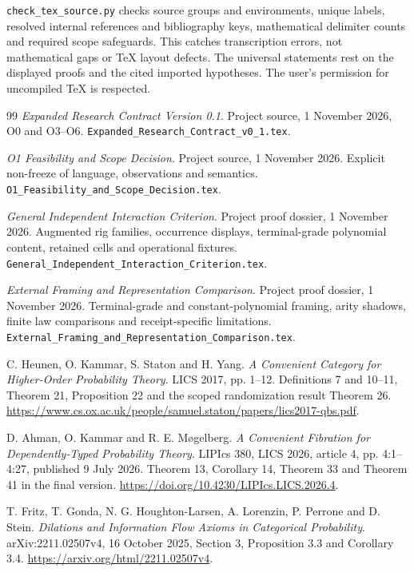 \documentclass[11pt,a4paper]{article}
\theoremstyle{definition}
\begin{document}
\texttt{check\_tex\_source.py} checks source groups and environments,
unique labels, resolved internal references and bibliography keys,
mathematical delimiter counts and required scope safeguards. This catches
transcription errors, not mathematical gaps or TeX layout defects.
The universal statements rest on the displayed proofs and the cited
imported hypotheses. The user's permission for uncompiled TeX is respected.

\begin{thebibliography}{99}
\emph{Expanded Research Contract Version 0.1}. Project source,
1 November 2026, O0 and O3--O6.
\texttt{Expanded\_Research\_Contract\_v0\_1.tex}.

\emph{O1 Feasibility and Scope Decision}. Project source,
1 November 2026. Explicit non-freeze of language, observations and semantics.
\texttt{O1\_Feasibility\_and\_Scope\_Decision.tex}.

\emph{General Independent Interaction Criterion}. Project proof dossier,
1 November 2026. Augmented rig families, occurrence displays, terminal-grade
polynomial content, retained cells and operational fixtures.
\texttt{General\_Independent\_Interaction\_Criterion.tex}.

\emph{External Framing and Representation Comparison}. Project proof dossier,
1 November 2026. Terminal-grade and constant-polynomial framing, arity shadows,
finite law comparisons and receipt-specific limitations.
\texttt{External\_Framing\_and\_Representation\_Comparison.tex}.

C. Heunen, O. Kammar, S. Staton and H. Yang.
\emph{A Convenient Category for Higher-Order Probability Theory}.
LICS 2017, pp. 1--12. Definitions 7 and 10--11, Theorem 21,
Proposition 22 and the scoped randomization result Theorem 26.
\url{https://www.cs.ox.ac.uk/people/samuel.staton/papers/lics2017-qbs.pdf}.

D. Ahman, O. Kammar and R. E. M\o gelberg.
\emph{A Convenient Fibration for Dependently-Typed Probability Theory}.
LIPIcs 380, LICS 2026, article 4, pp. 4:1--4:27, published 9 July 2026.
Theorem 13, Corollary 14, Theorem 33 and Theorem 41 in the final version.
\url{https://doi.org/10.4230/LIPIcs.LICS.2026.4}.

T. Fritz, T. Gonda, N. G. Houghton-Larsen, A. Lorenzin,
P. Perrone and D. Stein.
\emph{Dilations and Information Flow Axioms in Categorical Probability}.
arXiv:2211.02507v4, 16 October 2025, Section 3, Proposition 3.3 and
Corollary 3.4.
\url{https://arxiv.org/html/2211.02507v4}.
\end{thebibliography}
\end{document}
